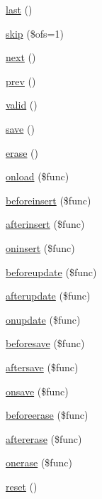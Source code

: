 \begin{DoxyCompactItemize}
\hyperlink{class_d_b_1_1_cursor_ac90cadb327363232bb2d83a4f8ebd613}{last} ()
\item 
\hyperlink{class_d_b_1_1_cursor_aad399d205074eaeed711d5e0157b3c0a}{skip} (\$ofs=1)
\item 
\hyperlink{class_d_b_1_1_cursor_acea62048bfee7b3cd80ed446c86fb78a}{next} ()
\item 
\hyperlink{class_d_b_1_1_cursor_a190535b88008d474b610585a5d9eb84c}{prev} ()
\item 
\hyperlink{class_d_b_1_1_cursor_abb9f0d6adf1eb9b3b55712056861a247}{valid} ()
\item 
\hyperlink{class_d_b_1_1_cursor_afc8a3c62679cf00ade9f15fb2a6d6132}{save} ()
\item 
\hyperlink{class_d_b_1_1_cursor_a933f3fa1037c8b797bdd237d811edf82}{erase} ()
\item 
\hyperlink{class_d_b_1_1_cursor_a7615e052068ed5e2c78a87f9b562f98e}{onload} (\$func)
\item 
\hyperlink{class_d_b_1_1_cursor_ae34d64fef3b7e4de2eede65ca67751d7}{beforeinsert} (\$func)
\item 
\hyperlink{class_d_b_1_1_cursor_a192a31bc101b9aafb4e1300883d33dc6}{afterinsert} (\$func)
\item 
\hyperlink{class_d_b_1_1_cursor_ab3ebd70359a4d0916e07bc3523099fff}{oninsert} (\$func)
\item 
\hyperlink{class_d_b_1_1_cursor_a9f11326bbf4cdec47ac4f1d143f1dfba}{beforeupdate} (\$func)
\item 
\hyperlink{class_d_b_1_1_cursor_a2b621278d4f2ed751338a1d1bfb60e70}{afterupdate} (\$func)
\item 
\hyperlink{class_d_b_1_1_cursor_a6af536a479e72aff418c5965eff20320}{onupdate} (\$func)
\item 
\hyperlink{class_d_b_1_1_cursor_a9d837ab7aea1a740986d5f6c0258b395}{beforesave} (\$func)
\item 
\hyperlink{class_d_b_1_1_cursor_a4b19070ae7f1fc2edeee8e0252f8ebb2}{aftersave} (\$func)
\item 
\hyperlink{class_d_b_1_1_cursor_a507f285ea3bb622446f79e07e838e147}{onsave} (\$func)
\item 
\hyperlink{class_d_b_1_1_cursor_a50acd223a47511be7b2e92dd1d504268}{beforeerase} (\$func)
\item 
\hyperlink{class_d_b_1_1_cursor_aa8c748ed4bf2cba7c84ce360e00dbe2a}{aftererase} (\$func)
\item 
\hyperlink{class_d_b_1_1_cursor_aebef85c8e2c1ece8cb36a60dc332595f}{onerase} (\$func)
\item 
\hyperlink{class_d_b_1_1_cursor_a4a20559544fdf4dcb457e258dc976cf8}{reset} ()
\end{DoxyCompactItemize}
